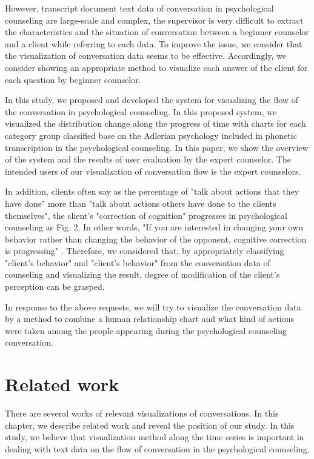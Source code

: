 \documentclass[review]{elsarticle}
\begin{document}
  However, transcript document text data of conversation in psychological counseling are large-scale and complex, the supervisor is very difficult to extract the characteristics and the situation of conversation between a beginner counselor and a client while referring to each data. To improve the issue, we consider that the visualization of conversation data seems to be effective. Accordingly, we consider showing an appropriate method to visualize each answer of the client for each question by beginner counselor.

  In this study, we proposed and developed the system for visualizing the flow of the conversation in psychological counseling. In this proposed system, we visualized the distribution change along the progress of time with  charts for each category group classified base on the Adlerian psychology included in phonetic transcription in the psychological counseling. In this paper, we show the overview of the system and the results of  user evaluation by the expert counselor. The intended users of our visualization of conversation flow is the expert counselors.

   In addition, clients often say as the percentage of "talk about actions that they have done" more than "talk about actions others have done to the clients themselves", the client's "correction of cognition" progresses in psychological counseling as Fig. 2. In other words, "If you are interested in changing your own behavior rather than changing the behavior of the opponent, cognitive correction is progressing" \cite{zokad}. Therefore, we considered that, by appropriately classifying "client's behavior" and "client's behavior" from the conversation data of counseling and visualizing the result, degree of modification of the client's perception can be grasped.

  In response to the above requests, we will try to visualize the conversation data by a method to combine a human relationship chart and what kind of actions were taken among the people appearing during the psychological counseling conversation.
\section{Related work}
   There are several works of relevant visualizations of conversations. In this chapter, we describe related work and reveal the position of our study. In this study, we believe that visualization method along the time series is important in dealing with text data on the flow of conversation in the psychological counseling.
\end{document}
